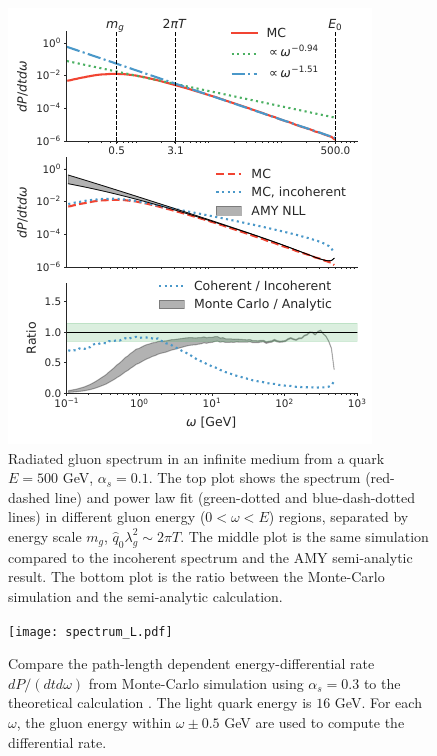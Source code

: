 \documentclass[aps, prc, reprint, amsmath, groupedaddress, nofootinbib]{revtex4-1}
\begin{document}
{\begin{figure}
\includegraphics[width=\columnwidth]{spectrum.pdf}
\caption{Radiated gluon spectrum in an infinite medium from a quark $E=500$ GeV, $\alpha_s = 0.1$. The top plot shows the spectrum (red-dashed line) and power law fit (green-dotted and blue-dash-dotted lines) in different gluon energy ($0<\omega < E$) regions, separated by energy scale $m_g$, $\hat{q}_0\lambda_g^2 \sim 2\pi T$. The middle plot is the same simulation compared to the incoherent spectrum and the AMY semi-analytic result. The bottom plot is the ratio between the Monte-Carlo simulation and the semi-analytic calculation.}
\label{fig:spectrum}
\end{figure}

\begin{figure}
\texttt{[image: spectrum\_L.pdf]}
\caption{Compare the path-length dependent energy-differential rate $dP/(dtd\omega)$ from Monte-Carlo simulation using $\alpha_s = 0.3$ to the theoretical calculation \cite{CaronHuot:2008uh}. The light quark energy is $16$ GeV. For each $\omega$, the gluon energy within $\omega \pm 0.5$ GeV are used to compute the differential rate.}
\label{fig:spectra-L-alphas=0.3}
\end{figure}

}
\end{document}
